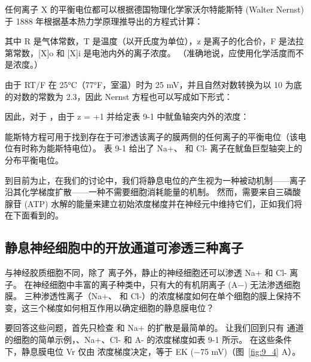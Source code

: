 任何离子 X 的平衡电位都可以根据德国物理化学家沃尔特能斯特 (Walter Nernst) 于 1888 年根据基本热力学原理推导出的方程式计算：


其中 R 是气体常数，T 是温度（以开氏度为单位），z 是离子的化合价，F 是法拉第常数，[X]o 和 [X]i 是电池内外的离子浓度。
（准确地说，应使用化学活度而不是浓度。）


由于 RT/F 在 25°C（77°F，室温）时为 25 mV，并且自然对数转换为以 10 为底的对数的常数为 2.3，因此 Nernst 方程也可以写成如下形式：


因此，对于 ，由于 z = +1 并给定表 9-1 中鱿鱼轴突内外的浓度：


能斯特方程可用于找到存在于可渗透该离子的膜两侧的任何离子的平衡电位（该电位有时称为能斯特电位）。
表 9-1 给出了 Na+、 和 Cl- 离子在鱿鱼巨型轴突上的分布平衡电位。


到目前为止，在我们的讨论中，我们将静息电位的产生视为一种被动机制——离子沿其化学梯度扩散——一种不需要细胞消耗能量的机制。
然而，需要来自三磷酸腺苷 (ATP) 水解的能量来建立初始浓度梯度并在神经元中维持它们，正如我们将在下面看到的。



\subsection{静息神经细胞中的开放通道可渗透三种离子}

与神经胶质细胞不同，除了  离子外，静止的神经细胞还可以渗透 Na+ 和 Cl- 离子。
在神经细胞中丰富的离子种类中，只有大的有机阴离子 (A−) 无法渗透细胞膜。
三种渗透性离子（Na+、 和 Cl-）的浓度梯度如何在单个细胞的膜上保持不变，这三个梯度如何相互作用以确定细胞的静息膜电位？


要回答这些问题，首先只检查  和 Na+ 的扩散是最简单的。
让我们回到只有  通道的细胞的简单示例，、Na+、Cl- 和 A- 的浓度梯度如表 9-1 所示。
在这些条件下，静息膜电位 Vr 仅由  浓度梯度决定，等于 EK (−75 mV)（图~\ref{fig:9_4} A）。


